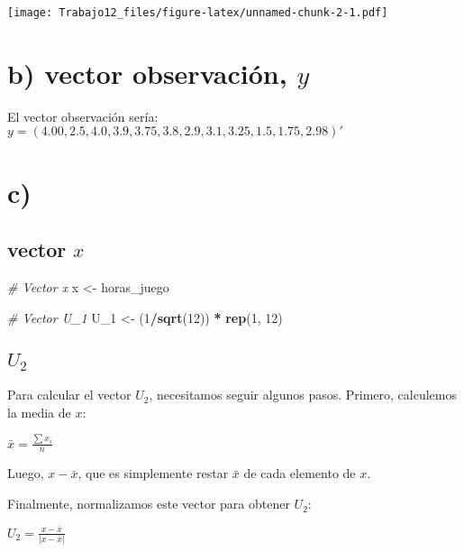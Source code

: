 \documentclass[
]{article}
\newenvironment{Shaded}{\begin{snugshade}}{\end{snugshade}}
\newcommand{\CommentTok}[1]{\textcolor[rgb]{0.56,0.35,0.01}{\textit{#1}}}
\newcommand{\DecValTok}[1]{\textcolor[rgb]{0.00,0.00,0.81}{#1}}
\newcommand{\FunctionTok}[1]{\textcolor[rgb]{0.13,0.29,0.53}{\textbf{#1}}}
\newcommand{\NormalTok}[1]{#1}
\newcommand{\OtherTok}[1]{\textcolor[rgb]{0.56,0.35,0.01}{#1}}
\newcommand{\SpecialCharTok}[1]{\textcolor[rgb]{0.81,0.36,0.00}{\textbf{#1}}}
\begin{document}
\texttt{[image: Trabajo12\_files/figure-latex/unnamed-chunk-2-1.pdf]}

\hypertarget{b-vector-observaciuxf3n-y}{%
\section{\texorpdfstring{b) vector observación,
\(y\)}{b) vector observación, y}}\label{b-vector-observaciuxf3n-y}}

El vector observación sería:
\(y = (4.00, 2.5, 4.0, 3.9, 3.75, 3.8, 2.9, 3.1, 3.25, 1.5, 1.75, 2.98)'\)

\hypertarget{c}{%
\section{c)}\label{c}}

\hypertarget{vector-x}{%
\subsection{\texorpdfstring{vector \(x\)}{vector x}}\label{vector-x}}

\begin{Shaded}
\begin{Highlighting}[]
\CommentTok{\# Vector x}
\NormalTok{x }\OtherTok{\textless{}{-}}\NormalTok{ horas\_juego}

\CommentTok{\# Vector U\_1}
\NormalTok{U\_1 }\OtherTok{\textless{}{-}}\NormalTok{ (}\DecValTok{1}\SpecialCharTok{/}\FunctionTok{sqrt}\NormalTok{(}\DecValTok{12}\NormalTok{)) }\SpecialCharTok{*} \FunctionTok{rep}\NormalTok{(}\DecValTok{1}\NormalTok{, }\DecValTok{12}\NormalTok{)}
\end{Highlighting}
\end{Shaded}

\hypertarget{u_2}{%
\subsection{\texorpdfstring{\(U_2\)}{U\_2}}\label{u_2}}

Para calcular el vector \(U_2\), necesitamos seguir algunos pasos.
Primero, calculemos la media de \(x\):

\(\bar{x} = \frac{\sum x_i}{n}\)

Luego, \(x - \bar{x}\), que es simplemente restar \(\bar{x}\) de cada
elemento de \(x\).

Finalmente, normalizamos este vector para obtener \(U_2\):

\(U_2 = \frac{x - \bar{x}}{|x - \bar{x}|}\)
\end{document}
